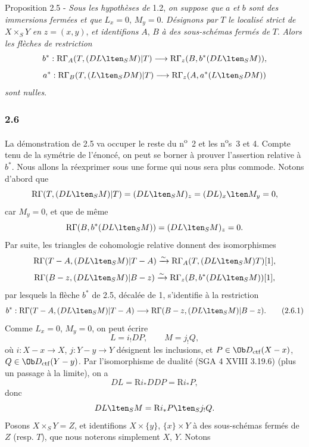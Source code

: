 \begin{statement}{Proposition 2.5 -}
\emph{Sous les hypothèses de} 1.2, \emph{on suppose que} $a$ \emph{et} $b$ \emph{sont des immersions fermées et que} $L_x=0$, $M_y=0$. \emph{Désignons par} $T$ \emph{le localisé strict de} $X\times_SY$ \emph{en} $z=(x,y)$, \emph{et identifions} $A$, $B$ \emph{à des sous-schémas fermés de} $T$. \emph{Alors les flèches de restriction}
\[
b^*:\mathrm{R}\Gamma_A(T,(DL\lten_SM)|T)
 \longrightarrow \mathrm{R}\Gamma_z(B,b^*(DL\lten_SM)),
\]
\[
a^*:\mathrm{R}\Gamma_B(T,(L\lten_SDM)|T)
 \longrightarrow \mathrm{R}\Gamma_z(A,a^*(L\lten_SDM))
\]
\emph{sont nulles}.
\end{statement}

\subsubsection*{2.6}
La démonstration de 2.5 va occuper le reste du n\textsuperscript{o}~2 et les n\textsuperscript{o}s~3 et 4. Compte tenu de la symétrie de l'énoncé, on peut se borner à prouver l'assertion relative à $b^*$. Nous allons la réexprimer sous une forme qui nous sera plus commode. Notons d'abord que
\[
\mathrm{R}\Gamma(T,(DL\lten_SM)|T)
 =(DL\lten_SM)_z
 =(DL)_x\lten M_y=0,
\]
car $M_y=0$, et que de même
\[
\mathrm{R}\Gamma(B,b^*(DL\lten_SM))
 =(DL\lten_SM)_z=0.
\]
Par suite, les triangles de cohomologie relative donnent des isomorphismes
\[
\mathrm{R}\Gamma(T-A,(DL\lten_SM)|T-A)
 \xrightarrow{\sim}
\mathrm{R}\Gamma_A(T,(DL\lten_SM)T)[1],
\]
\[
\mathrm{R}\Gamma(B-z,(DL\lten_SM)|B-z)
 \xrightarrow{\sim}
\mathrm{R}\Gamma_z(B,b^*(DL\lten_SM))[1],
\]
par lesquels la flèche $b^*$ de 2.5, décalée de 1, s'identifie à la restriction
\begin{equation}
b^*:\mathrm{R}\Gamma(T-A,(DL\lten_SM)|T-A)
 \longrightarrow \mathrm{R}\Gamma(B-z,(DL\lten_SM)|B-z).
\tag{2.6.1}
\end{equation}
Comme $L_x=0$, $M_y=0$, on peut écrire
\begin{equation}
L=i_!DP,\qquad M=j_!Q,
\tag{2.6.2}
\end{equation}
où $i:X-x\to X$, $j:Y-y\to Y$
désignent les inclusions, et $P\in\Ob D_{\mathrm{ctf}}(X-x)$, $Q\in\Ob D_{\mathrm{ctf}}(Y-y)$. Par l'isomorphisme de dualité (SGA 4 XVIII 3.19.6) (plus un passage à la limite), on a
\[
DL=\mathrm{R} i_*DDP=\mathrm{R} i_*P,
\]
donc
\[
DL\lten_SM=\mathrm{R} i_*P\lten_Sj_!Q.
\]
Posons $X\times_SY=Z$, et identifions $X\times\{y\}$, $\{x\}\times Y$ à des sous-schémas fermés de $Z$ (resp. $T$), que nous noterons simplement $X$, $Y$. Notons
